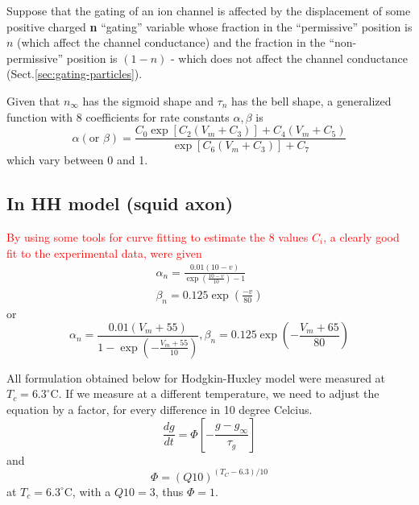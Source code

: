 Suppose that the gating of an ion channel is affected by the displacement of
some positive charged {\bf n} ``gating'' variable whose fraction in the
``permissive'' position is $n$ (which affect the channel conductance) and the
fraction in the ``non-permissive'' position is $(1-n)$ - which does not affect
the channel conductance (Sect.\ref{sec:gating-particles}).

Given that $n_\infty$ has the sigmoid shape and $\tau_n$ has the bell
shape, a generalized function with 8 coefficients for rate constants
$\alpha, \beta$ is
\begin{equation}
  \label{eq:578}
  \alpha (\text{or } \beta) = \frac{C_0 \exp [C_2(V_m + C_3)] +C_4(V_m +C_5)}{\exp [C_6(V_m +C_3)] + C_7}
\end{equation}
which vary between 0 and 1.

\subsection{In HH model (squid axon)}

\textcolor{red}{ By using some tools for curve fitting to estimate the
  8 values $C_i$, a clearly good fit to the experimental data, were
  given}
\begin{equation}
  \label{eq:64_copy}
  \begin{split}
    \alpha_n = \frac{0.01 (10-v)}{\exp(\frac{10-v}{10}) - 1}
    \\
    \beta_n = 0.125 \exp(\frac{-v}{80})
  \end{split}
\end{equation}
or
\begin{equation}
  \label{eq:352_copy}
  \alpha_n = \frac{0.01 (V_m+55)}{1-\exp(-\frac{V_m+55}{10})}
  ,
  \beta_n = 0.125 \exp(-\frac{V_m+65}{80})  
\end{equation}

All formulation obtained below for Hodgkin-Huxley model were measured
at $T_c=6.3^\circ$C. If we measure at a different temperature, we need
to adjust the equation by a factor, for every difference in 10 degree
Celcius.
\begin{equation}
  \label{eq:930}
  \frac{dg}{dt} = \Phi \left[ - \frac{g-g_\infty}{\tau_g}\right]
\end{equation}
and
\begin{equation}
  \label{eq:931}
  \Phi=(Q10)^{(T_C-6.3)/10}
\end{equation}
at $T_c=6.3^\circ$C, with a $Q10=3$, thus $\Phi=1$. 


